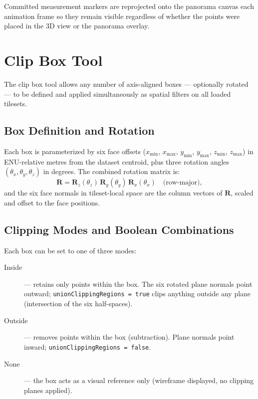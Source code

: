 Committed measurement markers are reprojected onto the panorama canvas each
animation frame so they remain visible regardless of whether the points were
placed in the 3D view or the panorama overlay.

\section{Clip Box Tool}
\label{sec:clipbox}

The clip box tool allows any number of axis-aligned boxes — optionally rotated
— to be defined and applied simultaneously as spatial filters on all loaded
tilesets.

\subsection{Box Definition and Rotation}

Each box is parameterized by six face offsets ($x_{\min}$, $x_{\max}$,
$y_{\min}$, $y_{\max}$, $z_{\min}$, $z_{\max}$) in ENU-relative metres from
the dataset centroid, plus three rotation angles $(\theta_x, \theta_y,
\theta_z)$ in degrees. The combined rotation matrix is:
\begin{equation}
  \mathbf{R} = \mathbf{R}_z(\theta_z)\,\mathbf{R}_y(\theta_y)\,
    \mathbf{R}_x(\theta_x) \quad \text{(row-major)},
\end{equation}
and the six face normals in tileset-local space are the column vectors of
$\mathbf{R}$, scaled and offset to the face positions.

\subsection{Clipping Modes and Boolean Combinations}

Each box can be set to one of three modes:
\begin{description}
  \item[Inside] — retains only points within the box. The six rotated plane
    normals point outward; \texttt{unionClippingRegions = true} clips anything
    outside any plane (intersection of the six half-spaces).
  \item[Outside] — removes points within the box (subtraction). Plane normals
    point inward; \texttt{unionClippingRegions = false}.
  \item[None] — the box acts as a visual reference only (wireframe displayed,
    no clipping planes applied).
\end{description}

